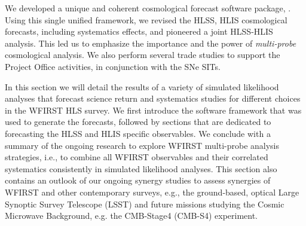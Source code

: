 \newcommand{\nn}{\nonumber}
\newcommand{\vpi}{\mathbf \pi}
\newcommand{\vecd}{\mathbf d}
\newcommand{\matC}{\mathbf C}
\newcommand{\matQ}{\mathbf Q}

\newcommand{\om}{\Omega_\mr m}
\newcommand{\omb}{\Omega_\mr b}
\newcommand{\sig}{\sigma_8}
\newcommand{\ns}{n_s}
\newcommand{\w}{w_0}
\newcommand{\wa}{w_a}

\renewcommand{\d}{{\rm d}}
\newcommand{\pd}{P_{\delta}}
\newcommand{\pe}{P_\mr E}

\newcommand{\vt}{\vartheta}
\newcommand{\vp}{\varphi}
\newcommand{\eps}{\epsilon}
\newcommand{\abs}[1]{| #1 |}
\newcommand{\mr}{\mathrm}

\renewcommand{\d}{{\rm d}}

\newcommand{\like}{L}
\newcommand{\prob}{P}
\newcommand{\probr}{P_r}
\newcommand{\p}{\mathbf p}
\newcommand{\pco}{\mathbf p_\mr{c}}
\newcommand{\pnu}{\mathbf p_\mr{n}}
\newcommand{\plf}{\mathbf p_\mr{LF}}
\newcommand{\D}{\mathbf D}
\newcommand{\Del}{\mathbf \Delta}
\newcommand{\M}{\mathbf M}
\newcommand{\N}{\mathbf N}
\newcommand{\U}{\mathbf U}


\begin{summary}
We developed a unique and coherent cosmological forecast software package, \CoLi. Using this single unified framework, we revised the HLSS, HLIS cosmological forecasts, including systematics effects, and pioneered a joint HLSS-HLIS analysis. This led us to emphasize the importance and the power of \emph{multi-probe} cosmological analysis. We also perform several trade studies to support the Project Office activities, in conjunction with the SNe SITs.
\end{summary}


In this section we will detail the results of a variety of simulated likelihood analyses that forecast science return and systematics studies for different choices in the WFIRST HLS survey. We first introduce the \CoLi software framework that was used to generate the forecasts, followed by sections that are dedicated to forecasting the HLSS and HLIS specific observables. We conclude with a summary of the ongoing research to explore WFIRST multi-probe analysis strategies, i.e., to combine all WFIRST observables and their correlated systematics consistently in simulated likelihood analyses. This section also contains an outlook of our ongoing synergy studies to assess synergies of WFIRST and other contemporary surveys, e.g., the ground-based, optical Large Synoptic Survey Telescope (LSST) and future missions studying the Cosmic Microwave Background, e.g. the CMB-Stage4 (CMB-S4) experiment.

